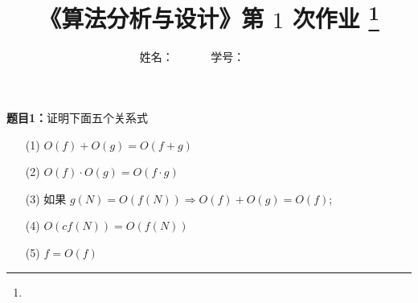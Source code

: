 \documentclass[12pt,a4paper]{article}
\begin{document}
\title{
{\heiti《算法分析与设计》第 {$1$} 次作业
\footnote{
}
}
}
\date{}

\author{
姓名：\underline{}~~~~~~
学号：\underline{}~~~~~~}

\maketitle

\noindent
\section*{\heiti \color{red}{证明题}}
\noindent
{\bf 题目1：}证明下面五个关系式
\begin{enumerate}
\item[(1)] $O(f)+O(g)=O(f+g)$ 
\item[(2)]$O(f) \cdot O(g)=O(f \cdot g)$
\item[(3)]如果 $g(N)=O(f(N)) \Rightarrow O(f)+O(g)=O(f)$;
\item[(4)]$O(c f(N))=O(f(N))$
\item[(5)]$f=O(f)$
\end{enumerate}
\end{document}
